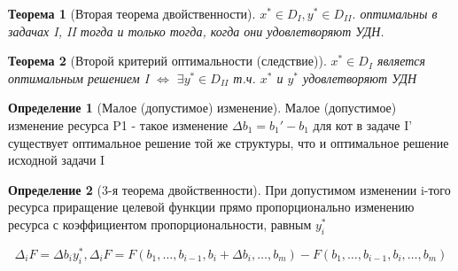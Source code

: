 \documentclass[a4paper]{article}
\newtheorem{theorem}{Теорема}[section]
\theoremstyle{definition}
\newtheorem*{definition}{Определение}
\theoremstyle{remark}
\begin{document}
\begin{theorem}[Вторая теорема двойственности]
    $x^* \in D_I, y^*\in D_{II}.$ оптимальны в задачах I, II тогда и только тогда, когда они удовлетворяют УДН.
\end{theorem}
\begin{theorem}[Второй критерий оптимальности (следствие)]
    \(x^* \in D_I\) является оптимальным решением I \(\Leftrightarrow\)
    \(\exists y^* \in D_{II}\) т.ч. \(x^*\) и \(y^*\) удовлетворяют УДН
\end{theorem}
\begin{definition}[Малое (допустимое) изменение]
    Малое (допустимое) изменение ресурса P1 - такое изменение $\Delta b_1 = b_1' - b_1$ для кот в задаче I' существует оптимальное решение той же структуры, что и оптимальное решение исходной задачи I
\end{definition}
\begin{definition}[3-я теорема двойственности]
    При допустимом изменении i-того ресурса приращение целевой функции прямо пропорционально изменению ресурса с коэффициентом пропорциональности, равным $y_i^*$

    $$\Delta_i F = \Delta b_i y_i^*, \Delta_i F = F(b_1, \dots, b_{i-1}, b_i + \Delta b_i, \dots, b_m)-F(b_1, \dots, b_{i-1}, b_i, \dots, b_m)$$
\end{definition}
\end{document}
